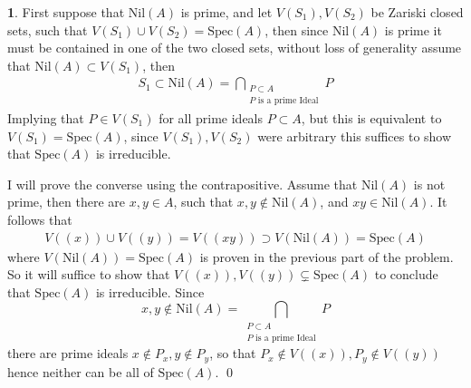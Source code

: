 \documentclass[11pt]{article}
\theoremstyle{definition}
\newtheorem{pb}{}
\newcommand{\spec}{\text{Spec}}
\newcommand{\nil}{\text{Nil}}
\begin{document}
    \begin{pb}
        First suppose that \(\nil(A)\) is prime, and let \(V(S_1), V(S_2)\) be Zariski closed sets, such that \(V(S_1) \cup V(S_2) = \spec(A)\), then since \(\nil(A)\) is prime it must be contained in one of the two closed sets, without loss of generality assume that \(\nil(A) \subset V(S_1)\), then
        \begin{align*}
            S_1 \subset \nil(A) = \bigcap_{\substack{P \subset A \\ P \text{ is a prime Ideal}}} P
        \end{align*}
        Implying that \(P \in V(S_1)\) for all prime ideals \(P \subset A\), but this is equivalent to \(V(S_1) = \spec(A)\), since \(V(S_1),V(S_2)\) were arbitrary this suffices to show that \(\spec(A)\) is irreducible.

        I will prove the converse using the contrapositive. Assume that \(\nil(A)\) is not prime, then there are \(x,y \in A\), such that \(x,y \not \in \text{Nil}(A)\), and \(xy \in \nil(A)\). It follows that
        \begin{align*}
            V((x))\cup V((y)) = V((xy)) \supset V(\nil(A)) = \spec(A)
        \end{align*}
        where \(V(\nil(A)) = \spec(A)\) is proven in the previous part of the problem. So it will suffice to show that \(V((x)), V((y)) \subsetneq \spec(A)\) to conclude that \(\spec(A)\) is irreducible. Since \[x,y \not \in \nil(A) = \bigcap_{\substack{P \subset A \\ P \text{ is a prime Ideal}}} P\]
        there are prime ideals \(x \not \in P_x, y \not \in P_y\), so that \(P_x \not \in V((x)), P_y \not \in V((y))\) hence neither can be all of \(\spec(A)\). \qed
    \end{pb}
\end{document}
